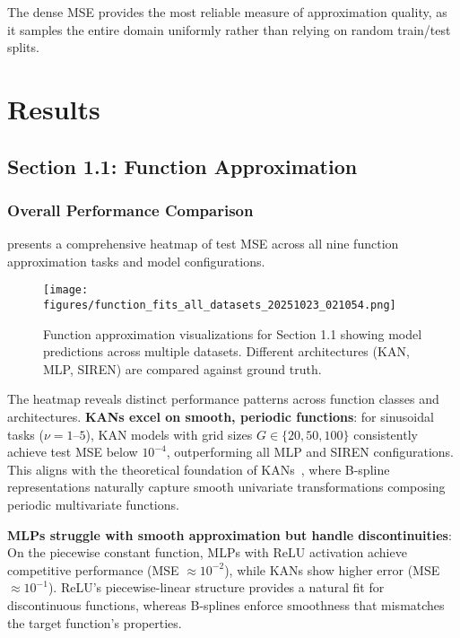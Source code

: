 \documentclass[11pt,a4paper]{article}
\begin{document}
The dense MSE provides the most reliable measure of approximation quality, as it samples the entire domain uniformly rather than relying on random train/test splits.

\section{Results}
\label{sec:results}

\subsection{Section 1.1: Function Approximation}

\subsubsection{Overall Performance Comparison}

 presents a comprehensive heatmap of test MSE across all nine function approximation tasks and model configurations.

\begin{figure}[htbp]
\centering
\texttt{[image: figures/function\_fits\_all\_datasets\_20251023\_021054.png]}
\caption{Function approximation visualizations for Section 1.1 showing model predictions across multiple datasets. Different architectures (KAN, MLP, SIREN) are compared against ground truth.}
\label{fig:s11_heatmap}
\end{figure}

The heatmap reveals distinct performance patterns across function classes and architectures. \textbf{KANs excel on smooth, periodic functions}: for sinusoidal tasks ($\nu = 1$--$5$), KAN models with grid sizes $G \in \{20, 50, 100\}$ consistently achieve test MSE below $10^{-4}$, outperforming all MLP and SIREN configurations. This aligns with the theoretical foundation of KANs~\citep{liu2024kan}, where B-spline representations naturally capture smooth univariate transformations composing periodic multivariate functions.

\textbf{MLPs struggle with smooth approximation but handle discontinuities}: On the piecewise constant function, MLPs with ReLU activation achieve competitive performance (MSE $\approx 10^{-2}$), while KANs show higher error (MSE $\approx 10^{-1}$). ReLU's piecewise-linear structure provides a natural fit for discontinuous functions, whereas B-splines enforce smoothness that mismatches the target function's properties.
\end{document}
